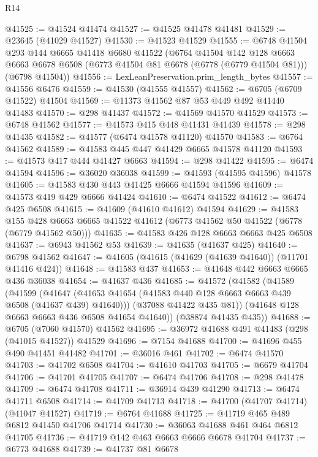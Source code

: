 \begin{lexlean}{R14}
\begin{coremodule}
@41525 := @41524 @41474
@41527 := @41525 @41478 @41481
@41529 := @23645 (@41029 @41527)
@41530 := @41523 @41529
@41555 := @6748
    @41504
    @293
    @144
    @6665
    @41418
    @6680
    @41522
    (@6764
      @41504
      @142
      @128
      @6663
      @6663
      @6678
      @6508
      (@6773 @41504 @81 @6678 (@6778 (@6779 @41504 @81)))
      (@6798 @41504))
@41556 := LexLeanPreservation.prim_length_bytes
@41557 := @41556 @6476
@41559 := @41530 (@41555 @41557)
@41562 := @6705 (@6709 @41522) @41504
@41569 := @11373 @41562 @87 @53 @449 @492 @41440 @41483
@41570 := @298 @41437
@41572 := @41569 @41570 @41529
@41573 := @6748 @41562
@41577 := @41573 @415 @448 @41431 @41439
@41578 := @298 @41435
@41582 := @41577 (@6474 @41578 @41120) @41570
@41583 := @6764 @41562
@41589 := @41583 @445 @447 @41429 @6665 @41578 @41120
@41593 := @41573 @417 @444 @41427 @6663
@41594 := @298 @41422
@41595 := @6474 @41594
@41596 := @36020 @36038
@41599 := @41593 (@41595 @41596) @41578
@41605 := @41583 @430 @443 @41425 @6666 @41594 @41596
@41609 := @41573 @419 @429 @6666 @41424
@41610 := @6474 @41522
@41612 := @6474 @425 @6508
@41615 := @41609 (@41610 @41612) @41594
@41629 := @41583
    @155
    @428
    @6663
    @6665
    @41522
    @41612
    (@6773 @41562 @50 @41522 (@6778 (@6779 @41562 @50)))
@41635 := @41583 @426 @128 @6663 @6663 @425 @6508
@41637 := @6943 @41562 @53
@41639 := @41635 (@41637 @425)
@41640 := @6798 @41562
@41647 := @41605 (@41615 (@41629 (@41639 @41640)) (@11701 @41416 @424))
@41648 := @41583 @437
@41653 := @41648 @442 @6663 @6665 @436 @36038
@41654 := @41637 @436
@41685 := @41572
    (@41582
      (@41589
        (@41599
          (@41647 (@41653 @41654 (@41583 @440 @128 @6663 @6663 @439 @6508 (@41637 @439) @41640)))
          (@37088 @41422 @435 @81))
        (@41648 @128 @6663 @6663 @436 @6508 @41654 @41640))
      (@38874 @41435 @435))
@41688 := @6705 (@7060 @41570) @41562
@41695 := @36972 @41688 @491 @41483 (@298 (@41015 @41527)) @41529
@41696 := @7154 @41688
@41700 := @41696 @455 @490 @41451 @41482
@41701 := @36016 @461
@41702 := @6474 @41570
@41703 := @41702 @6508
@41704 := @41610 @41703
@41705 := @6679 @41704
@41706 := @41701 @41705
@41707 := @6474 @41706
@41708 := @298 @41478
@41709 := @6474 @41708
@41711 := @36914 @439 @41290
@41713 := @6474 @41711 @6508
@41714 := @41709 @41713
@41718 := @41700 (@41707 @41714) (@41047 @41527)
@41719 := @6764 @41688
@41725 := @41719 @465 @489 @6812 @41450 @41706 @41714
@41730 := @36063 @41688 @461 @464 @6812 @41705
@41736 := @41719 @142 @463 @6663 @6666 @6678 @41704
@41737 := @6773 @41688
@41739 := @41737 @81 @6678

\end{coremodule}
\end{lexlean}
